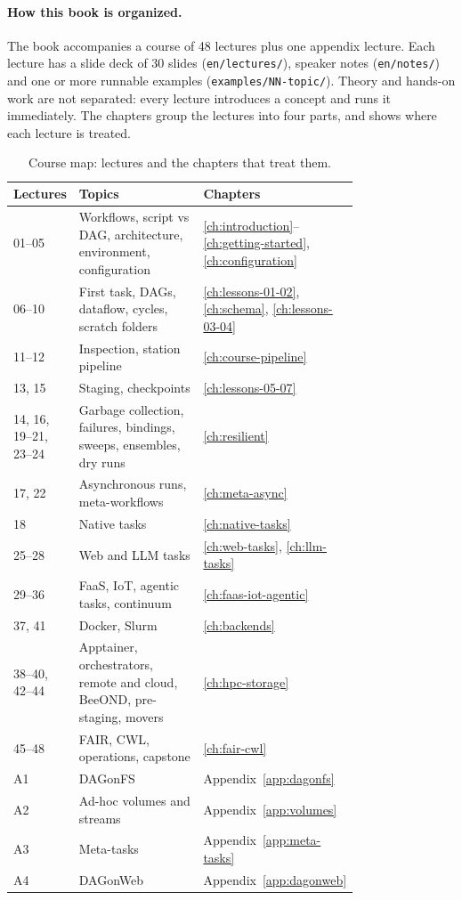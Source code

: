 \paragraph{How this book is organized.}
The book accompanies a course of 48 lectures plus one appendix lecture. Each
lecture has a slide deck of 30 slides (\texttt{en/lectures/}), speaker notes
(\texttt{en/notes/}) and one or more runnable examples
(\texttt{examples/NN-topic/}). Theory and hands-on work are not separated:
every lecture introduces a concept and runs it immediately. The chapters
group the lectures into four parts, and  shows where
each lecture is treated.

\begin{table}[h]
\centering
\small
\begin{tabular}{@{}lp{0.47\linewidth}p{0.30\linewidth}@{}}
\toprule
\textbf{Lectures} & \textbf{Topics} & \textbf{Chapters} \\
\midrule
01--05 & Workflows, script vs DAG, architecture, environment, configuration &
  \ref{ch:introduction}--\ref{ch:getting-started}, \ref{ch:configuration} \\
06--10 & First task, DAGs, dataflow, cycles, scratch folders &
  \ref{ch:lessons-01-02}, \ref{ch:schema}, \ref{ch:lessons-03-04} \\
11--12 & Inspection, station pipeline & \ref{ch:course-pipeline} \\
13, 15 & Staging, checkpoints & \ref{ch:lessons-05-07} \\
14, 16, 19--21, 23--24 & Garbage collection, failures, bindings, sweeps,
  ensembles, dry runs & \ref{ch:resilient} \\
17, 22 & Asynchronous runs, meta-workflows & \ref{ch:meta-async} \\
18 & Native tasks & \ref{ch:native-tasks} \\
25--28 & Web and LLM tasks & \ref{ch:web-tasks}, \ref{ch:llm-tasks} \\
29--36 & FaaS, IoT, agentic tasks, continuum & \ref{ch:faas-iot-agentic} \\
37, 41 & Docker, Slurm & \ref{ch:backends} \\
38--40, 42--44 & Apptainer, orchestrators, remote and cloud, BeeOND,
  pre-staging, movers & \ref{ch:hpc-storage} \\
45--48 & FAIR, CWL, operations, capstone & \ref{ch:fair-cwl} \\
A1 & DAGonFS & Appendix~\ref{app:dagonfs} \\
A2 & Ad-hoc volumes and streams & Appendix~\ref{app:volumes} \\
A3 & Meta-tasks & Appendix~\ref{app:meta-tasks} \\
A4 & DAGonWeb & Appendix~\ref{app:dagonweb} \\
\bottomrule
\end{tabular}
\caption{Course map: lectures and the chapters that treat them.}
\label{tab:course-map}
\end{table}

